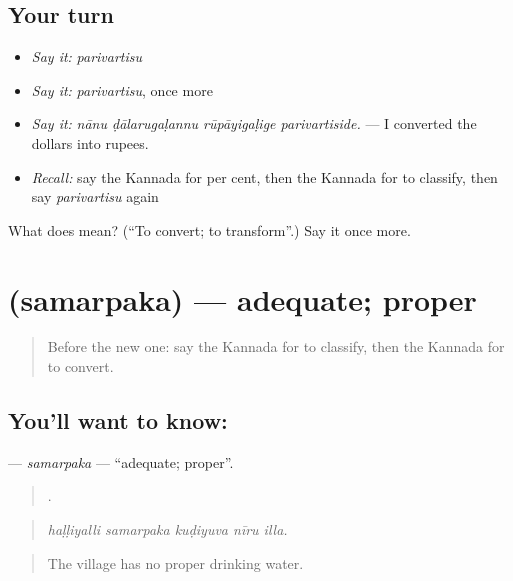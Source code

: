 \subsection*{Your turn}
\begin{itemize}
\raggedright
  \item \emph{Say it:} \emph{parivartisu}
  \item \emph{Say it:} \emph{parivartisu}, once more
  \item \emph{Say it:} \emph{nānu ḍālarugaḷannu rūpāyigaḷige parivartiside.} — I converted the dollars into rupees.
  \item \emph{Recall:} say the Kannada for per cent, then the Kannada for to classify, then say \emph{parivartisu} again
\end{itemize}

\begin{tcolorbox}[breakable,colback=teal!4,colframe=teal!35!black,title={Before you move on}]
What does  mean? (\textquotedblleft{}To convert; to transform\textquotedblright{}.) Say it once more.
\end{tcolorbox}
\section[\texorpdfstring{\kn{ಸಮರ್ಪಕ} (samarpaka)}{ಸಮರ್ಪಕ (samarpaka)}]{ (samarpaka) — adequate; proper}

\label{lesson:KA-C427-samarpaka}



\begin{quote}
Before the new one: say the Kannada for to classify, then the Kannada for to convert.
\end{quote}

\subsection*{You'll want to know: }
\textbf{} — \emph{samarpaka} — \textquotedblleft{}adequate; proper\textquotedblright{}.

\begin{quote}
    .
\end{quote}

\begin{quote}
\emph{haḷḷiyalli samarpaka kuḍiyuva nīru illa.}
\end{quote}

\begin{quote}
The village has no proper drinking water.
\end{quote}

